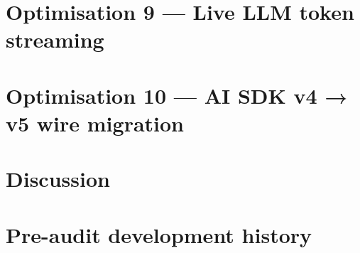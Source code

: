 \section{Optimisation 9 — Live LLM token streaming}
\label{sec:opt-token-streaming}
%

\section{Optimisation 10 — AI SDK v4 → v5 wire migration}
\label{sec:opt-aisdk-v5}
%

\section{Discussion}

\appendix
\section{Pre-audit development history}
\label{app:history}
